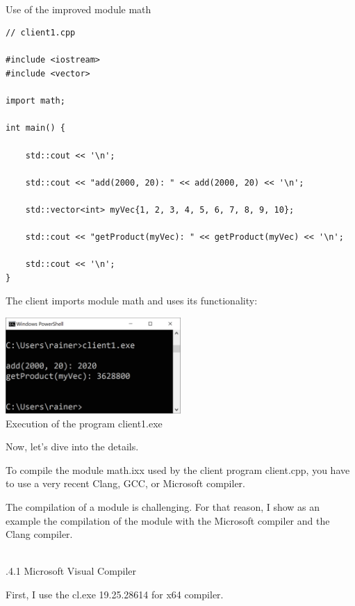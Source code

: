 \hspace*{\fill} \\ %
\noindent
Use of the improved module math
\begin{lstlisting}[style=styleCXX]
// client1.cpp

#include <iostream>
#include <vector>

import math;

int main() {
	
	std::cout << '\n';
	
	std::cout << "add(2000, 20): " << add(2000, 20) << '\n';
	
	std::vector<int> myVec{1, 2, 3, 4, 5, 6, 7, 8, 9, 10};
	
	std::cout << "getProduct(myVec): " << getProduct(myVec) << '\n';
	
	std::cout << '\n';
}
\end{lstlisting}

The client imports module math and uses its functionality:

\begin{center}
\includegraphics[width=0.5\textwidth]{content/3/chapter4/images/17.png}\\
Execution of the program client1.exe
\end{center}

Now, let’s dive into the details.


To compile the module math.ixx used by the client program client.cpp, you have to use a very recent Clang, GCC, or Microsoft compiler.

The compilation of a module is challenging. For that reason, I show as an example the compilation of the module with the Microsoft compiler and the Clang compiler.

\hspace*{\fill} \\ %
.4.1\hspace{0.2cm} Microsoft Visual Compiler

First, I use the cl.exe 19.25.28614 for x64 compiler.

